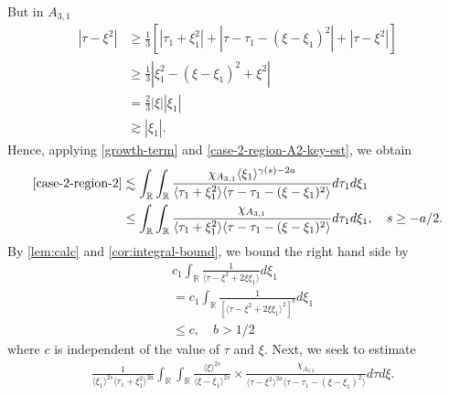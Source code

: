 \documentclass[12pt,reqno]{amsart}
\numberwithin{equation}{section}  %
\numberwithin{figure}{section}
\newcommand{\rr}{\mathbb{R}}
\theoremstyle{plain}
\theoremstyle{definition}
\theoremstyle{remark}
\begin{document}
%
%
%
But in $A_{3,1}$
%
%
\begin{equation}
\begin{split}
  | \tau - \xi^{2} |
  & \ge \frac{1}{3} \left[ | \tau_{1} + \xi_{1}^{2} | + | \tau - \tau_{1} -
  (\xi - \xi_{1})^{2} | + | \tau - \xi^{2} | \right]
  \\
  & \ge \frac{1}{3} | \xi_{1}^{2} - (\xi - \xi_{1})^{2} + \xi^{2} |
  \\
  & = \frac{2}{3}| \xi | | \xi_{1} |
  \\
  & \gtrsim  | \xi_{1} |.
\end{split}
\label{case-2-region-A2-key-est}
\end{equation}
%
%
Hence, applying \eqref{growth-term} and \eqref{case-2-region-A2-key-est}, we obtain
%
%
%
%
\begin{equation*}
\begin{split}
  \eqref{case-2-region-2}
  & \lesssim 
  \int_{\rr} \int_{\rr} \frac{\chi_{A_{3,1}} \langle \xi_{1}
  \rangle^{\gamma(s) -2a}}{  
    \langle \tau_{1} + \xi_{1}^{2} \rangle \langle  \tau - \tau_{1} -
    (\xi - \xi_{1})^{2} \rangle }
    d \tau_1 d \xi_{1}
    \\
    & \le \int_{\rr} \int_{\rr} \frac{\chi_{A_{3,1}}}{  
    \langle \tau_{1} + \xi_{1}^{2} \rangle \langle  \tau - \tau_{1} -
    (\xi - \xi_{1})^{2} \rangle }
    d \tau_1 d \xi_{1}, \quad s \ge -a/2.
\end{split}
\end{equation*}
By \autoref{lem:calc} and \autoref{cor:integral-bound}, we bound the right hand
side by
%
%
\begin{equation*}
\begin{split}
  & c_{1} \int_{\rr}  \frac{1}{\langle \tau - \xi^{2} + 2 \xi \xi_{1} 
  \rangle }d \xi_{1}
  \\
  & = c_{1} \int_{\rr}  \frac{1}{\left [ \langle \tau - \xi^{2} + 2 \xi \xi_{1} 
  \rangle ^{2} \right ]^{b}}d \xi_{1}
  \\
  & \le  c, \quad b > 1/2
\end{split}
\end{equation*}
where $c$ is independent of the value of $\tau$ and $\xi$. 
Next, we seek to estimate
\begin{equation*}
\begin{split}
  &  \frac{1}{\langle \xi_{1} \rangle ^{2s}
  \langle \tau_{1} + \xi_{1}^{2}  \rangle
  ^{2a}} \int_{\rr} \int_{\rr} \frac{\langle \xi \rangle ^{2s}}{\langle
  \xi - \xi_{1}\rangle ^{2s}}  \times \frac{\chi_{A_{3,2}}}{\langle
  \tau - \xi^{2} \rangle ^{2a} \langle \tau - \tau_{1} - (\xi -
  \xi_{1})^{2} \rangle } d \tau d \xi.
\end{split}
\end{equation*}
\end{document}
